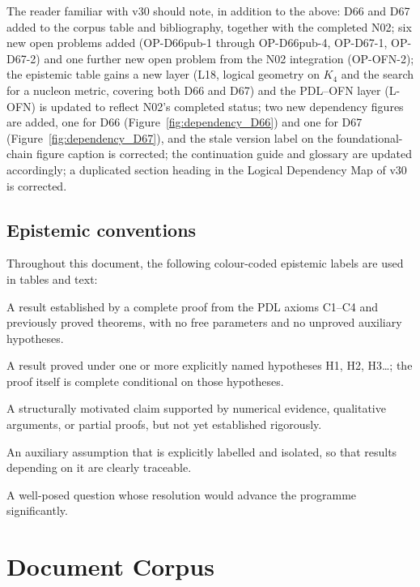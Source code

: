 \documentclass[11pt,a4paper]{article}
\theoremstyle{plain}
\theoremstyle{definition}
\theoremstyle{remark}
\begin{document}
The reader familiar with v30 should note, in addition to the above: D66 and D67 added to the corpus table and bibliography, together with the completed N02; six new open problems added (OP-D66pub-1 through OP-D66pub-4, OP-D67-1, OP-D67-2) and one further new open problem from the N02 integration (OP-OFN-2); the epistemic table gains a new layer (L18, logical geometry on $K_4$ and the search for a nucleon metric, covering both D66 and D67) and the PDL--OFN layer (L-OFN) is updated to reflect N02's completed status; two new dependency figures are added, one for D66 (Figure~\ref{fig:dependency_D66}) and one for D67 (Figure~\ref{fig:dependency_D67}), and the stale version label on the foundational-chain figure caption is corrected; the continuation guide and glossary are updated accordingly; a duplicated section heading in the Logical Dependency Map of v30 is corrected.

\subsection{Epistemic conventions}
\label{subsec:conventions}
Throughout this document, the following colour-coded epistemic labels are used in tables and text:
\begin{description}[leftmargin=2.5cm, style=nextline]
\item[\textcolor{proofblue}{Theorem}] A result established by a complete proof from the PDL axioms C1--C4 and previously proved theorems, with no free parameters and no unproved auxiliary hypotheses.
\item[\textcolor{proofblue}{Theorem (H$x$)}] A result proved under one or more explicitly named hypotheses H1, H2, H3\ldots; the proof itself is complete conditional on those hypotheses.
\item[\textcolor{conjecturegreen}{Conjecture}] A structurally motivated claim supported by numerical evidence, qualitative arguments, or partial proofs, but not yet established rigorously.
\item[\textcolor{hypothesisorange}{Named Hypothesis}] An auxiliary assumption that is explicitly labelled and isolated, so that results depending on it are clearly traceable.
\item[\textcolor{openproblemred}{Open Problem}] A well-posed question whose resolution would advance the programme significantly.
\end{description}

\section{Document Corpus}
\label{sec:corpus}
\end{document}
